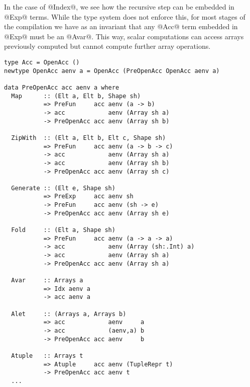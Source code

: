 In the case of @Index@, we see how the recursive step can be embedded in @Exp@ terms. While the type system does not enforce this, for most stages of the compilation we have as an invariant that any @Acc@ term embedded in @Exp@ must be an @Avar@. This way, scalar computations can access arrays previously computed but cannot compute further array operations.


\begin{lstlisting}[label=lst:acc-ast, caption={The first-order abstract syntax of the \texttt{Acc} level of Accelerate.}, style=haskell]
type Acc = OpenAcc ()
newtype OpenAcc aenv a = OpenAcc (PreOpenAcc OpenAcc aenv a)

data PreOpenAcc acc aenv a where
  Map      :: (Elt a, Elt b, Shape sh)
           => PreFun     acc aenv (a -> b)
           -> acc            aenv (Array sh a)
           -> PreOpenAcc acc aenv (Array sh b)

  ZipWith  :: (Elt a, Elt b, Elt c, Shape sh)
           => PreFun     acc aenv (a -> b -> c)
           -> acc            aenv (Array sh a)
           -> acc            aenv (Array sh b)
           -> PreOpenAcc acc aenv (Array sh c)

  Generate :: (Elt e, Shape sh)
           => PreExp     acc aenv sh
           -> PreFun     acc aenv (sh -> e)
           -> PreOpenAcc acc aenv (Array sh e)

  Fold     :: (Elt a, Shape sh)
           => PreFun     acc aenv (a -> a -> a)
           -> acc            aenv (Array (sh:.Int) a)
           -> acc            aenv (Array sh a)
           -> PreOpenAcc acc aenv (Array sh a)

  Avar     :: Arrays a
           => Idx aenv a
           -> acc aenv a

  Alet     :: (Arrays a, Arrays b)
           => acc            aenv     a
           -> acc            (aenv,a) b
           -> PreOpenAcc acc aenv     b

  Atuple   :: Arrays t
           => Atuple     acc aenv (TupleRepr t)
           -> PreOpenAcc acc aenv t
  ...
\end{lstlisting}

